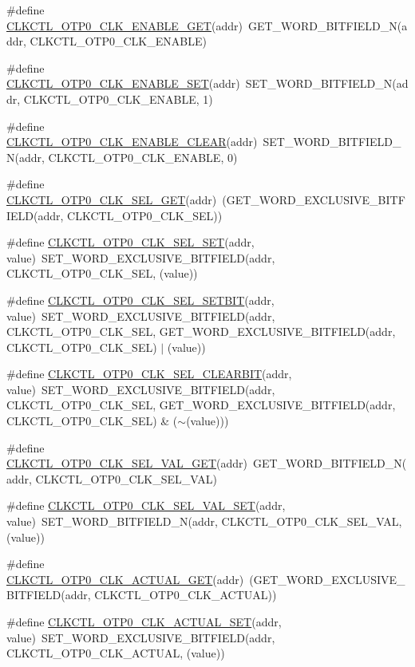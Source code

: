 \begin{DoxyCompactItemize}
\item 
\#define \hyperlink{a00544_a2dc78c28a96504efc01724e734bce691}{CLKCTL\_\-OTP0\_\-CLK\_\-ENABLE\_\-GET}(addr)~GET\_\-WORD\_\-BITFIELD\_\-N(addr, CLKCTL\_\-OTP0\_\-CLK\_\-ENABLE)
\item 
\#define \hyperlink{a00544_a236e3c39adc4064f76b9547800969521}{CLKCTL\_\-OTP0\_\-CLK\_\-ENABLE\_\-SET}(addr)~SET\_\-WORD\_\-BITFIELD\_\-N(addr, CLKCTL\_\-OTP0\_\-CLK\_\-ENABLE, 1)
\item 
\#define \hyperlink{a00544_a55330314d9826368744ff89d595a6836}{CLKCTL\_\-OTP0\_\-CLK\_\-ENABLE\_\-CLEAR}(addr)~SET\_\-WORD\_\-BITFIELD\_\-N(addr, CLKCTL\_\-OTP0\_\-CLK\_\-ENABLE, 0)
\item 
\#define \hyperlink{a00544_ae55d1c82aedbbe2c5f862b81f703e60a}{CLKCTL\_\-OTP0\_\-CLK\_\-SEL\_\-GET}(addr)~(GET\_\-WORD\_\-EXCLUSIVE\_\-BITFIELD(addr, CLKCTL\_\-OTP0\_\-CLK\_\-SEL))
\item 
\#define \hyperlink{a00544_a08912bc36c2772f17ae67d5848cfb595}{CLKCTL\_\-OTP0\_\-CLK\_\-SEL\_\-SET}(addr, value)~SET\_\-WORD\_\-EXCLUSIVE\_\-BITFIELD(addr, CLKCTL\_\-OTP0\_\-CLK\_\-SEL, (value))
\item 
\#define \hyperlink{a00544_aed5bc2cdb8106d919842374d908b6928}{CLKCTL\_\-OTP0\_\-CLK\_\-SEL\_\-SETBIT}(addr, value)~SET\_\-WORD\_\-EXCLUSIVE\_\-BITFIELD(addr, CLKCTL\_\-OTP0\_\-CLK\_\-SEL, GET\_\-WORD\_\-EXCLUSIVE\_\-BITFIELD(addr, CLKCTL\_\-OTP0\_\-CLK\_\-SEL) $|$ (value))
\item 
\#define \hyperlink{a00544_a786aded388afa3c5f33931536ceb909a}{CLKCTL\_\-OTP0\_\-CLK\_\-SEL\_\-CLEARBIT}(addr, value)~SET\_\-WORD\_\-EXCLUSIVE\_\-BITFIELD(addr, CLKCTL\_\-OTP0\_\-CLK\_\-SEL, GET\_\-WORD\_\-EXCLUSIVE\_\-BITFIELD(addr, CLKCTL\_\-OTP0\_\-CLK\_\-SEL) \& ($\sim$(value)))
\item 
\#define \hyperlink{a00544_a31ff9ec65b4b6182a606e8fb9b0d1cc2}{CLKCTL\_\-OTP0\_\-CLK\_\-SEL\_\-VAL\_\-GET}(addr)~GET\_\-WORD\_\-BITFIELD\_\-N(addr, CLKCTL\_\-OTP0\_\-CLK\_\-SEL\_\-VAL)
\item 
\#define \hyperlink{a00544_abb2213ed10997a20ee31ddcc7da81e1a}{CLKCTL\_\-OTP0\_\-CLK\_\-SEL\_\-VAL\_\-SET}(addr, value)~SET\_\-WORD\_\-BITFIELD\_\-N(addr, CLKCTL\_\-OTP0\_\-CLK\_\-SEL\_\-VAL, (value))
\item 
\#define \hyperlink{a00544_a79803b0490d9c9e9230cea347bc9d0ef}{CLKCTL\_\-OTP0\_\-CLK\_\-ACTUAL\_\-GET}(addr)~(GET\_\-WORD\_\-EXCLUSIVE\_\-BITFIELD(addr, CLKCTL\_\-OTP0\_\-CLK\_\-ACTUAL))
\item 
\#define \hyperlink{a00544_aaa9c3d7a82705bca489dc56d780800c7}{CLKCTL\_\-OTP0\_\-CLK\_\-ACTUAL\_\-SET}(addr, value)~SET\_\-WORD\_\-EXCLUSIVE\_\-BITFIELD(addr, CLKCTL\_\-OTP0\_\-CLK\_\-ACTUAL, (value))

\end{DoxyCompactItemize}
